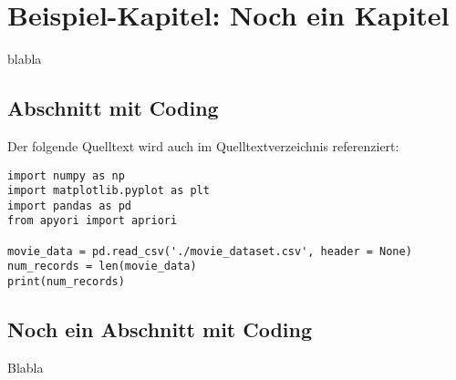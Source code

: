 \chapter{Beispiel-Kapitel: Noch ein Kapitel}

blabla

\section{Abschnitt mit Coding}

Der folgende Quelltext wird auch im Quelltextverzeichnis referenziert:

\begin{lstlisting}[caption={\texttt{PrintMovieDB.py}},captionpos=b]
import numpy as np  
import matplotlib.pyplot as plt  
import pandas as pd  
from apyori import apriori

movie_data = pd.read_csv('./movie_dataset.csv', header = None)
num_records = len(movie_data)
print(num_records)
\end{lstlisting}

\section{Noch ein Abschnitt mit Coding}
Blabla